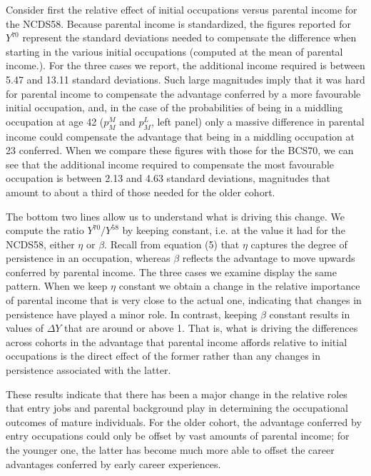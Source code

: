 Consider first the relative effect of initial occupations versus parental income for the NCDS58. Because parental income is standardized, the figures reported for $Y^{70}$ represent the standard deviations needed to compensate the difference when starting in the various initial occupations (computed at the mean of parental income.). For the three cases we report, the additional income required is between 5.47 and 13.11 standard deviations. Such large magnitudes imply that it was hard for parental income to compensate the advantage conferred by a more favourable initial occupation, and, in the case of the probabilities of being in a middling occupation at age 42 ($p_M^M$  and $p_M^L$, left panel) only a massive difference in parental income could compensate the advantage that being in a middling occupation at 23 conferred. When we compare these figures with those for the BCS70, we can see that the additional income required to compensate the most favourable occupation is between 2.13 and 4.63 standard deviations, magnitudes that amount to about a third of those needed for the older cohort. 

The bottom two lines allow us to understand what is driving this change. We compute the ratio $Y^{70}/Y^{58}$ by keeping constant, i.e. at the value it had for the NCDS58, either $\eta$ or $\beta$. Recall from equation (5) that $\eta$ captures the degree of persistence in an occupation, whereas $\beta$ reflects the advantage to move upwards conferred by parental income. The three cases we examine display the same pattern. When we keep $\eta$ constant we obtain a change in the relative importance of parental income that is very close to the actual one, indicating that changes in persistence have played a minor role. In contrast, keeping $\beta$ constant results in values of $\Delta Y$ that are around or above 1. That is, what is driving the differences across cohorts in the advantage that parental income affords relative to initial occupations is the direct effect of the former rather than any changes in persistence associated with the latter.

These results indicate that there has been a major change in the relative roles that entry jobs and parental background play in determining the occupational outcomes of mature individuals. For the older cohort, the advantage conferred by entry occupations could only be offset by vast amounts of parental income; for the younger one, the latter has become much more able to offset the career advantages conferred by early career experiences.
